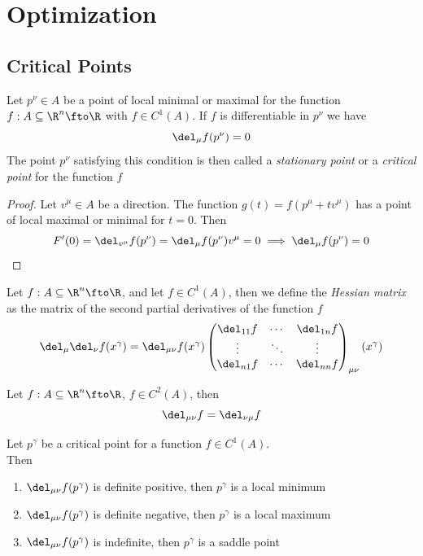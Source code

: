 \documentclass[../mmf.tex]{subfiles}
\begin{document}
\section{Optimization}
\subsection{Critical Points}
\begin{thm}[Fermat]
	Let $p^\nu\in A$ be a point of local minimal or maximal for the function $f:A\subseteq\R^n\fto\R$ with $f\in C^1(A)$. If $f$ is differentiable in $p^\nu$ we have
	\begin{equation}
		\del_\mu f(p^\nu)=0
		\label{eq:fermthm}
	\end{equation}
	The point $p^\nu$ satisfying this condition is then called a \textit{stationary point} or a \textit{critical point} for the function $f$
\end{thm}
\begin{proof}
	Let $v^\mu\in A$ be a direction. The function $g(t)=f(p^\mu+tv^\mu)$ has a point of local maximal or minimal for $t=0$. Then
	\begin{equation}
		F'(0)=\del_{v^\mu}f(p^\nu)=\del_\mu f(p^\nu)v^\mu=0\implies{}\del_\mu f(p^\nu)=0
		\label{eq:frmthmproof}
	\end{equation}
\end{proof}
\begin{dfn}
	Let $f:A\subseteq\R^n\fto\R$, and let $f\in C^1(A)$, then we define the \textit{Hessian matrix} as the matrix of the second partial derivatives of the function $f$
	\begin{equation}
		\del_\mu\del_\nu f(x^\gamma)=\del_{\mu\nu}f(x^\gamma)\begin{pmatrix}\del_{11}f&\cdots&\del_{1n}f\\\vdots&\ddots&\vdots\\\del_{n1}f&\cdots&\del_{nn}f\end{pmatrix}_{\mu\nu}(x^\gamma)
		\label{eq:hessianmatrix}
	\end{equation}
\end{dfn}
\begin{thm}[Schwarz]
	Let $f:A\subseteq\R^n\fto\R$, $f\in C^2(A)$, then
	\begin{equation}
		\del_{\mu\nu}f=\del_{\nu\mu}f
		\label{eq:simmhess}
	\end{equation}
\end{thm}
\begin{dfn}
	Let $p^\gamma$ be a critical point for a function $f\in C^1(A)$.\\
	Then
	\begin{enumerate}
	\item $\del_{\mu\nu}f(p^\gamma)$ is definite positive, then $p^\gamma$ is a local minimum
	\item $\del_{\mu\nu}f(p^\gamma)$ is definite negative, then $p^\gamma$ is a local maximum
	\item $\del_{\mu\nu}f(p^\gamma)$ is indefinite, then $p^\gamma$ is a saddle point
	\end{enumerate}
\end{dfn}
\end{document}
